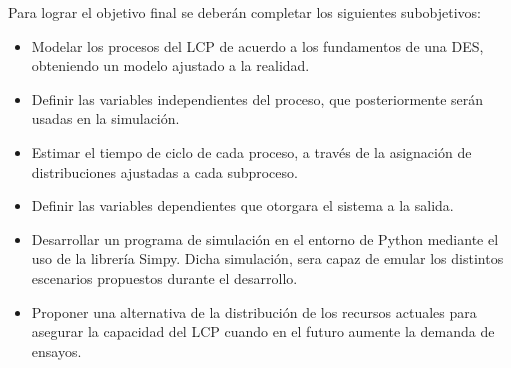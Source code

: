 Para lograr el objetivo final se deberán completar los siguientes subobjetivos:

\begin{itemize}
	\item Modelar los procesos del LCP
		de acuerdo a los fundamentos de una DES,
		obteniendo un modelo ajustado a la realidad.
	\item Definir las variables independientes del proceso,
		que posteriormente serán usadas en la simulación.
	\item Estimar el tiempo de ciclo de cada proceso,
		a través de la asignación de
		distribuciones ajustadas a cada subproceso.
	\item Definir las variables dependientes
		que otorgara el sistema a la salida.
	\item Desarrollar un programa de simulación en el entorno de Python
		mediante el uso de la librería Simpy.
		Dicha simulación, sera capaz de emular
		los distintos escenarios propuestos durante el desarrollo.
	\item Proponer una alternativa de la distribución de los recursos actuales
		para asegurar la capacidad del LCP cuando en el futuro aumente la
		demanda de ensayos.
\end{itemize}
